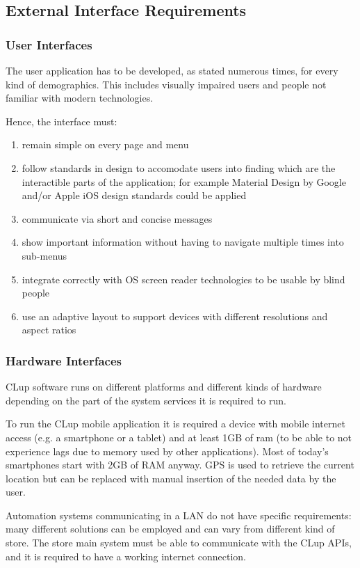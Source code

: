 \subsection{External Interface Requirements}
\subsubsection{User Interfaces}
The user application has to be developed, as stated numerous times, for every kind of demographics.
This includes visually impaired users and people not familiar with modern technologies.

Hence, the interface must:
\begin{enumerate}
    \item remain simple on every page and menu
    \item follow standards in design to accomodate users into finding which are the interactible parts of the application; for example Material Design by Google and/or Apple iOS design standards could be applied
    \item communicate via short and concise messages
    \item show important information without having to navigate multiple times into sub-menus
    \item integrate correctly with OS screen reader technologies to be usable by blind people
    \item use an adaptive layout to support devices with different resolutions and aspect ratios
\end{enumerate}

\subsubsection{Hardware Interfaces}
CLup software runs on different platforms and different kinds of hardware depending on the part of the system services it is required to run.

To run the CLup mobile application it is required a device with mobile internet access (e.g. a smartphone or a tablet) and at least 1GB of ram (to be able to not experience lags due to memory used by other applications). Most of today's smartphones start with 2GB of RAM anyway.
GPS is used to retrieve the current location but can be replaced with manual insertion of the needed data by the user.

Automation systems communicating in a LAN do not have specific requirements: many different solutions can be employed and can vary from different kind of store. The store main system must be able to communicate with the CLup APIs, and it is required to have a working internet connection.

